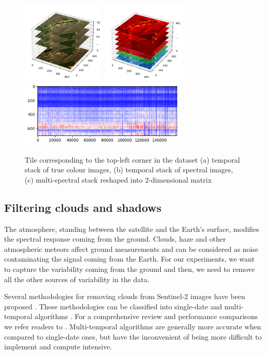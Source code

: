 \documentclass[essd, manuscript]{copernicus}
\begin{document}
\begin{figure}%
    {{\includegraphics[width=4cm]{fig2a.png} }}%
    {{\includegraphics[width=4cm]{fig2b.png} }}%
    {{\includegraphics[width=8cm]{fig2c.png} }}%
    \caption{Tile corresponding to the top-left corner in the dataset (a) temporal stack of true colour images, (b) temporal stack of spectral images, (c) multi-spectral stack reshaped into 2-dimensional matrix}%
    \label{dataset_detail}%
\end{figure}

\subsection{Filtering clouds and shadows}
The atmosphere, standing between the satellite and the Earth's surface, modifies the spectral response coming from the ground. Clouds, haze and other atmospheric meteors affect ground measurements and can be considered as noise contaminating the signal coming from the Earth. For our experiments, we want to capture the variability coming from the ground and then, we need to remove all the other sources of variability in the data.

Several methodologies for removing clouds from Sentinel-2 images have been proposed \citep{louis2016sentinel,hagolle2017maja,qiu2019fmask}. These methodologies can be classified into single-date and multi-temporal algorithms \citep{}. For a comprehensive review and performance comparisons we refer readers to \citep{zhu2018cloud}. Multi-temporal algorithms are generally more accurate when compared to single-date ones, but have the inconvenient of being more difficult to implement and compute intensive.
\end{document}
